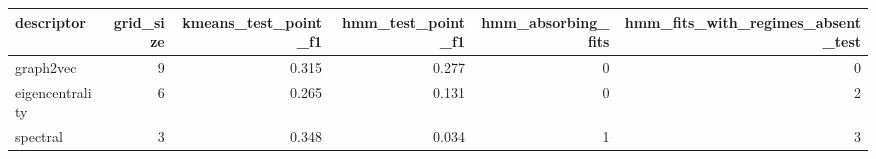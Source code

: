 \begin{tabular}{lrrrrr}
\toprule
descriptor & grid\_size & kmeans\_test\_point\_f1 & hmm\_test\_point\_f1 & hmm\_absorbing\_fits & hmm\_fits\_with\_regimes\_absent\_test \\
\midrule
graph2vec & 9 & 0.315 & 0.277 & 0 & 0 \\
eigencentrality & 6 & 0.265 & 0.131 & 0 & 2 \\
spectral & 3 & 0.348 & 0.034 & 1 & 3 \\
\bottomrule
\end{tabular}
